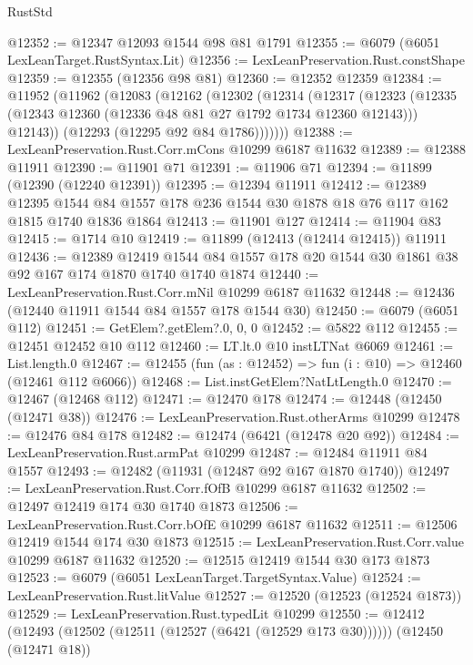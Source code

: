 \begin{lexlean}{RustStd}
\begin{coremodule}
@12352 := @12347 @12093 @1544 @98 @81 @1791
@12355 := @6079 (@6051 LexLeanTarget.RustSyntax.Lit)
@12356 := LexLeanPreservation.Rust.constShape
@12359 := @12355 (@12356 @98 @81)
@12360 := @12352 @12359
@12384 := @11952
    (@11962
      (@12083
        (@12162
          (@12302
            (@12314
              (@12317
                (@12323
                  (@12335 (@12343 @12360 (@12336 @48 @81 @27 @1792 @1734 @12360 @12143)))
                  @12143))
              (@12293 (@12295 @92 @84 @1786)))))))
@12388 := LexLeanPreservation.Rust.Corr.mCons @10299 @6187 @11632
@12389 := @12388 @11911
@12390 := @11901 @71
@12391 := @11906 @71
@12394 := @11899 (@12390 (@12240 @12391))
@12395 := @12394 @11911
@12412 := @12389
    @12395
    @1544
    @84
    @1557
    @178
    @236
    @1544
    @30
    @1878
    @18
    @76
    @117
    @162
    @1815
    @1740
    @1836
    @1864
@12413 := @11901 @127
@12414 := @11904 @83
@12415 := @1714 @10
@12419 := @11899 (@12413 (@12414 @12415)) @11911
@12436 := @12389
    @12419
    @1544
    @84
    @1557
    @178
    @20
    @1544
    @30
    @1861
    @38
    @92
    @167
    @174
    @1870
    @1740
    @1740
    @1874
@12440 := LexLeanPreservation.Rust.Corr.mNil @10299 @6187 @11632
@12448 := @12436 (@12440 @11911 @1544 @84 @1557 @178 @1544 @30)
@12450 := @6079 (@6051 @112)
@12451 := GetElem?.getElem?.{0, 0, 0}
@12452 := @5822 @112
@12455 := @12451 @12452 @10 @112
@12460 := LT.lt.{0} @10 instLTNat @6069
@12461 := List.length.{0}
@12467 := @12455 (fun (as : @12452) => fun (i : @10) => @12460 (@12461 @112 @6066))
@12468 := List.instGetElem?NatLtLength.{0}
@12470 := @12467 (@12468 @112)
@12471 := @12470 @178
@12474 := @12448 (@12450 (@12471 @38))
@12476 := LexLeanPreservation.Rust.otherArms @10299
@12478 := @12476 @84 @178
@12482 := @12474 (@6421 (@12478 @20 @92))
@12484 := LexLeanPreservation.Rust.armPat @10299
@12487 := @12484 @11911 @84 @1557
@12493 := @12482 (@11931 (@12487 @92 @167 @1870 @1740))
@12497 := LexLeanPreservation.Rust.Corr.fOfB @10299 @6187 @11632
@12502 := @12497 @12419 @174 @30 @1740 @1873
@12506 := LexLeanPreservation.Rust.Corr.bOfE @10299 @6187 @11632
@12511 := @12506 @12419 @1544 @174 @30 @1873
@12515 := LexLeanPreservation.Rust.Corr.value @10299 @6187 @11632
@12520 := @12515 @12419 @1544 @30 @173 @1873
@12523 := @6079 (@6051 LexLeanTarget.TargetSyntax.Value)
@12524 := LexLeanPreservation.Rust.litValue
@12527 := @12520 (@12523 (@12524 @1873))
@12529 := LexLeanPreservation.Rust.typedLit @10299
@12550 := @12412
    (@12493 (@12502 (@12511 (@12527 (@6421 (@12529 @173 @30))))))
    (@12450 (@12471 @18))

\end{coremodule}
\end{lexlean}
